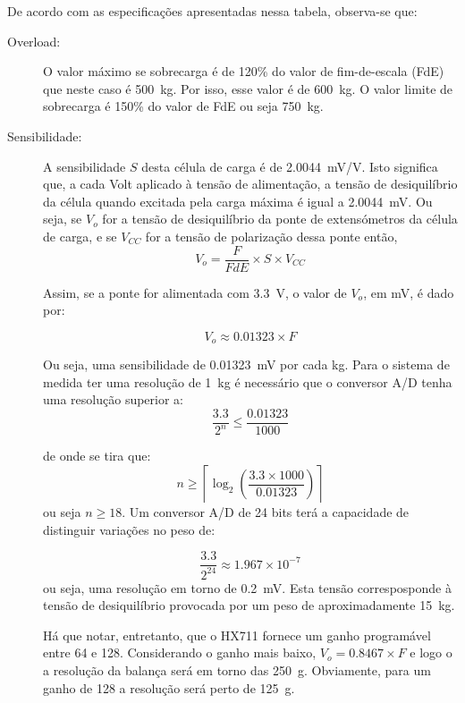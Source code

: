 \documentclass{article}
\begin{document}
De acordo com as especificações apresentadas nessa tabela, observa-se que:
\begin{description}
\item[Overload:] O valor máximo se sobrecarga é de 120\% do valor de fim-de-escala (FdE) que neste caso é 500~kg. Por isso, esse valor é de 600~kg. O valor limite de sobrecarga é 150\% do valor de FdE ou seja 750~kg.

\item[Sensibilidade:] A sensibilidade $S$ desta célula de carga é de 2.0044~mV/V. Isto significa que, a cada Volt aplicado à tensão de alimentação, a tensão de desiquilíbrio da célula quando excitada pela carga máxima é igual a 2.0044~mV. Ou seja, se $V_o$ for a tensão de desiquilíbrio da ponte de extensómetros da célula de carga, e se $V_{CC}$ for a tensão de polarização dessa ponte então,
\begin{equation}
V_o = \frac{F}{FdE} \times S\times V_{CC}
\end{equation}

Assim, se a ponte for alimentada com 3.3~V, o valor de $V_o$, em mV, é dado por:

\begin{equation}
V_o\approx 0.01323\times F
\end{equation}

Ou seja, uma sensibilidade de 0.01323~mV por cada kg. Para o sistema de medida ter uma resolução de 1~kg é necessário que o conversor A/D tenha uma resolução superior a:
\begin{equation}
\frac{3.3}{2^n}\le\frac{0.01323}{1000}
\end{equation}

de onde se tira que:
\begin{equation}
n \ge \left\lceil\log_2\left( \frac{3.3\times 1000}{0.01323}\right)\right\rceil
\end{equation}
ou seja $n\ge 18$. Um conversor A/D de 24 bits terá a capacidade de distinguir variações no peso de:

\begin{equation}
\frac{3.3}{2^{24}}\approx 1.967\times 10^{-7}
\end{equation}
ou seja, uma resolução em torno de 0.2~mV. Esta tensão corresposponde à tensão de desiquilíbrio provocada por um peso de aproximadamente 15~kg.

Há que notar, entretanto, que o HX711 fornece um ganho programável entre 64 e 128. Considerando o ganho mais baixo, $V_o=0.8467\times F$ e logo o a resolução da balança será em torno das 250~g. Obviamente, para um ganho de 128 a resolução será perto de 125~g.


\end{description}
\end{document}

